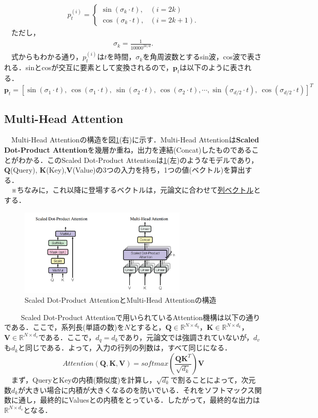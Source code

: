 \documentclass[a4j, 11pt]{jsarticle}
\numberwithin{equation}{section}
\begin{document}
\begin{align}
p_t^{(i)} = 
\begin{cases}
\sin (\sigma_k\cdot t) , & (i = 2k)\\
\cos (\sigma_k\cdot t) , & (i = 2k+1).
\end{cases}
\end{align}
　ただし，
\begin{align}
\sigma_k = \frac{1}{10000^{2k/d}}.
\end{align}
　式からもわかる通り，$p_t^{(i)}$は$t$を時間，$\sigma_k$を角周波数とするsin波，cos波で表される．sinとcosが交互に要素として変換されるので，$\mathbf{p}_t$は以下のように表される．
\begin{equation}
\mathbf{p}_t=[\sin(\sigma_1\cdot t), \ \cos(\sigma_1\cdot t), \ \sin(\sigma_2\cdot t), \ \cos(\sigma_2\cdot t), \cdots, \sin(\sigma_{d/2}\cdot t),\ \cos(\sigma_{d/2}\cdot t)]^T
\end{equation}

\subsection{Multi-Head Attention}
　Multi-Head Attentionの構造を図\ref{att_model}(右)に示す．Multi-Head Attentionは\textbf{Scaled Dot-Product Attention}を幾層か重ね，出力を連結(Concat)したものであることがわかる．このScaled Dot-Product Attentionは\ref{att_model}(左)のようなモデルであり，$\mathbf{Q}$(Query), $\mathbf{K}$(Key),$\mathbf{V}$(Value)の3つの入力を持ち，1つの値(ベクトル)を算出する．\\
　※ちなみに，これ以降に登場するベクトルは，元論文に合わせて\underline{列ベクトル}とする．
\begin{figure}[H]
\centering
\includegraphics[width=8cm]{attentions.png}
\caption{Scaled Dot-Product AttentionとMulti-Head Attentionの構造}
\label{att_model}
\end{figure}　
　Scaled Dot-Product Attentionで用いられているAttention機構は以下の通りである．ここで，系列長(単語の数)を$ N$とすると，$\mathbf{Q}\in\mathbb{R}^{ N\times d_{q}}$，$\mathbf{K}\in\mathbb{R}^{ N\times d_{k} }$，$\mathbf{V}\in\mathbb{R}^{ N\times d_{v}}$である．ここで，$d_q = d_k$であり，元論文では強調されていないが，$d_v$も$d_k$と同じである．よって，入力の行列の列数は，すべて同じになる．\\
\begin{equation}
Attention(\mathbf{Q}, \mathbf{K}, \mathbf{V}) = softmax\left(\frac{\mathbf{Q}\mathbf{K}^T}{\sqrt{d_k}} \right)\mathbf{V}
\label{at_sca}
\end{equation}
　まず，QueryとKeyの内積(類似度)を計算し，$\sqrt{d_k}$で割ることによって，次元数$d_k$が大きい場合に内積が大きくなるのを防いでいる．それをソフトマックス関数に通し，最終的にValuesとの内積をとっている．したがって，最終的な出力は$\mathbb{R}^{ N\times d_{v}}$となる．\\
\end{document}
